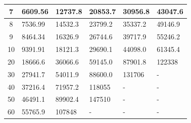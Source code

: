 \begin{table}[H]
\begin{tabular}{|c|l|l|l|l|l|}
7                                                                          & 6609.56                              & 12737.8                               & 20853.7                               & 30956.8                               & 43047.6                               \\ \hline
8                                                                          & 7536.99                              & 14532.3                               & 23799.2                               & 35337.2                               & 49146.9                               \\ \hline
9                                                                          & 8464.34                              & 16326.9                               & 26744.6                               & 39717.9                               & 55246.2                               \\ \hline
10                                                                         & 9391.91                              & 18121.3                               & 29690.1                               & 44098.0                               & 61345.4                               \\ \hline
20                                                                         & 18666.6                              & 36066.6                               & 59145.0                               & 87901.8                               & 122338                                \\ \hline
30                                                                         & 27941.7                              & 54011.9                               & 88600.0                               & 131706                                & -                                     \\ \hline
40                                                                         & 37216.4                              & 71957.2                               & 118055                                & -                                     & -                                     \\ \hline
50                                                                         & 46491.1                              & 89902.4                               & 147510                                & -                                     & -                                     \\ \hline
60                                                                         & 55765.9                              & 107848                                & -                                     & -                                     & -                                     \\ \hline

\end{tabular}
\end{table}

